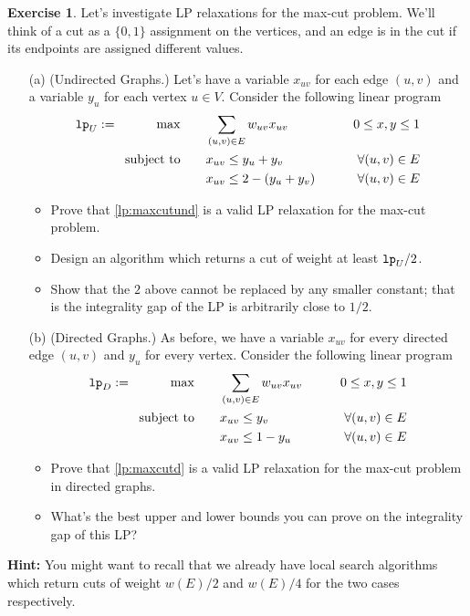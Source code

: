 \documentclass[11pt]{article}
\theoremstyle{definition}
\newtheorem{exercise}{Exercise}
\def\lp{{\tt lp}}
\begin{document}
\vspace{2ex}
\begin{exercise}
Let's investigate LP relaxations for the max-cut problem. 
We'll think of a cut as a $\{0,1\}$ assignment on the vertices, and 
an edge is in the cut if its endpoints are assigned different values. 
\begin{itemize}
\item[(a)]
(Undirected Graphs.) Let's have a variable $x_{uv}$ for each edge $(u,v)$ and a 
variable $y_u$ for each vertex $u\in V$. Consider the following linear program
\begin{align}
\lp_U := ~~~~~~~~~ \max & \qquad \sum_{(u,v)\in E} w_{uv}x_{uv} & \qquad 0 \le x,y \le 1 \label{lp:maxcutund} \\
\textrm{ subject to} & \qquad x_{uv} \le y_u + y_v & \qquad \forall (u,v)\in E \notag \\
			     & \qquad x_{uv} \le 2 - (y_u + y_v) & \qquad \forall (u,v)\in E \notag 	
\end{align}
\begin{itemize}
\item Prove that \eqref{lp:maxcutund} is a valid LP relaxation for the max-cut problem.
\item Design an algorithm which returns a cut of weight at least $\lp_U/2$.
\item Show that the $2$ above cannot be replaced by any smaller constant; that is the integrality gap of the LP is arbitrarily close to $1/2$.
\end{itemize}

\item[(b)] 
(Directed Graphs.) As before, we have a variable $x_{uv}$ for every directed edge $(u,v)$ and $y_u$ for
every vertex. Consider the following linear program
\begin{align}
\lp_D := ~~~~~~~~~ \max & \qquad \sum_{(u,v)\in E} w_{uv}x_{uv} & \qquad 0 \le x,y \le 1 \label{lp:maxcutd} \\
\textrm{ subject to} & \qquad x_{uv} \le y_v & \qquad \forall (u,v)\in E \notag \\
			     & \qquad x_{uv} \le 1 - y_u  & \qquad \forall (u,v)\in E \notag 	
\end{align}
\begin{itemize}
\item Prove that \eqref{lp:maxcutd} is a valid LP relaxation for the max-cut problem in directed graphs.
\item What's the best upper and lower bounds you can prove on the integrality gap of this LP? 
\end{itemize}
\end{itemize}
 {\bf Hint:} You might want to recall that we already have local search algorithms which return cuts
 of weight $w(E)/2$ and $w(E)/4$ for the two cases respectively.
\end{exercise}
\end{document}
